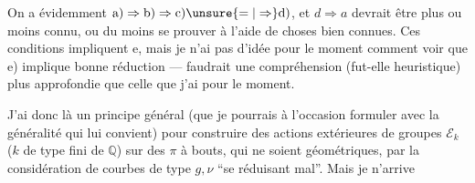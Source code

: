 On a évidemment $\mathrm{a)}\Rightarrow\mathrm{b)}\Rightarrow\mathrm{c)}\unsure{=|\Rightarrow}\mathrm{d)}$,
et $d\Rightarrow a$ devrait être plus ou moins
connu, ou du moins se prouver à
l'aide de choses bien connues. Ces
conditions impliquent e, mais je n'ai
pas d'idée pour le moment comment
voir que e) implique bonne réduction ---
faudrait une compréhension (fut-elle
heuristique) plus approfondie que celle
que j'ai pour le moment.

J'ai donc là un principe général
(que je pourrais à l'occasion formuler
avec la généralité qui lui convient) pour
construire des actions extérieures 
de groupes $\mathcal E_k$ ($k$  de type fini
de $\mathbb{Q}$) sur des $\pi$ à bouts, qui
ne soient géométriques, par  la
considération de courbes de type $g,\nu$
``se réduisant mal''. Mais je n'arrive
